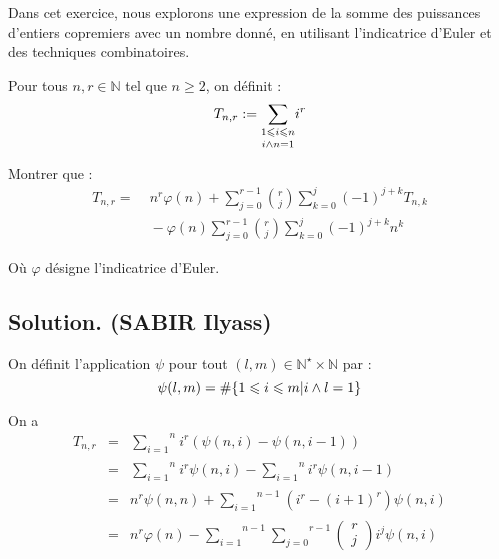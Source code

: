 Dans cet exercice, nous explorons une expression de la somme des puissances
d'entiers copremiers avec un nombre donn{\'e}, en utilisant l'indicatrice
d'Euler et des techniques combinatoires.

\begin{exercise}[]
Pour tous $n, r \in \mathbb{N}$ tel que $n \geqslant 2$, on d{\'e}finit :
\[ T_{n, r} := \underset{i \wedge n = 1}{\underset{1 \leqslant i
   \leqslant n}{\sum}} i^r \]


Montrer que :
\begin{align*}
T_{n, r} =\; & n^r \varphi(n) + \sum_{j = 0}^{r - 1} \binom{r}{j} 
\sum_{k = 0}^{j} (-1)^{j + k} T_{n, k} \\
& {} - \varphi(n) \sum_{j = 0}^{r - 1} \binom{r}{j} 
\sum_{k = 0}^{j} (-1)^{j + k} n^k
\end{align*}



O{\`u} $\varphi$ d{\'e}signe l'indicatrice d'Euler.

\end{exercise}

\subsection*{Solution. (SABIR Ilyass)}


On d{\'e}finit l'application $\psi$ pour tout $(l, m) \in \mathbb{N}^{\star}
\times \mathbb{N}$ par :
\[ \psi (l, m) =\# \{ 1 \leqslant i \leqslant m | i \wedge l = 1  \}
\]


On a
\begin{eqnarray*}
  T_{n, r} & = & \underset{}{\overset{n}{\underset{i = 1}{\sum}}} i^r (\psi
  (n, i) - \psi (n, i - 1))\\
  & = & \underset{}{\overset{n}{\underset{i = 1}{\sum}}} i^r \psi (n, i) -
  \overset{n}{\underset{i = 1}{\sum}} i^r \psi (n, i - 1)\\
  & = & n^r \psi (n, n) + \underset{}{\overset{n - 1}{\underset{i =
  1}{\sum}}} (i^r  - (i + 1)^r) \psi (n, i)\\
  & = & n^r \varphi (n) - \underset{}{\overset{n - 1}{\underset{i =
  1}{\sum}}} \overset{r - 1}{\underset{j = 0}{\sum}} \left( \begin{array}{c}
    r\\
    j
  \end{array} \right) i^j \psi (n, i)
\end{eqnarray*}


